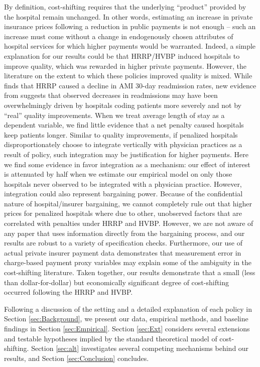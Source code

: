\documentclass[12pt]{article}
\begin{document}
By definition, cost-shifting requires that the underlying ``product'' provided by the hospital remain unchanged. In other words, estimating an increase in private insurance prices following a reduction in public payments is not enough -- such an increase must come without a change in endogenously chosen attributes of hospital services for which higher payments would be warranted.  Indeed, a simple explanation for our results could be that HRRP/HVBP induced hospitals to improve quality, which was rewarded in higher private payments.  However, the literature on the extent to which these policies improved quality is mixed. While \citet{mellor2016} finds that HRRP caused a decline in AMI 30-day readmission rates, new evidence from \citet{Ibrahim2017} suggests that observed decreases in readmissions may have been overwhelmingly driven by hospitals coding patients more severely and not by ``real'' quality improvements.  When we treat average length of stay as a dependent variable, we find little evidence that a net penalty caused hospitals keep patients longer.  Similar to quality improvements, if penalized hospitals disproportionately choose to integrate vertically with physician practices as a result of policy, such integration may be justification for higher payments.  Here we find some evidence in favor integration as a mechanism: our effect of interest is attenuated by half when we estimate our empirical model on only those hospitals never observed to be integrated with a physician practice.  However, integration could also represent bargaining power.  Because of the confidential nature of hospital/insurer bargaining, we cannot completely rule out that higher prices for penalized hospitals where due to other, unobserved factors that are correlated with penalties under HRRP and HVBP. However, we are not aware of any paper that uses information directly from the bargaining process, and our results are robust to a variety of specification checks.  Furthermore, our use of actual private insurer payment data demonstrates that measurement error in charge-based payment proxy variables may explain some of the ambiguity in the cost-shifting literature. Taken together, our results demonstrate that a small (less than dollar-for-dollar) but economically significant degree of cost-shifting occurred following the HRRP and HVBP.

Following a discussion of the setting and a detailed explanation of each policy in Section \ref{sec:Background}, we present our data, empirical methods, and baseline findings in Section \ref{sec:Empirical}. Section \ref{sec:Ext} considers several extensions and testable hypotheses implied by the standard theoretical model of cost-shifting.  Section \ref{sec:alt} investigates several competing mechanisms behind our results, and Section \ref{sec:Conclusion} concludes.
\end{document}
